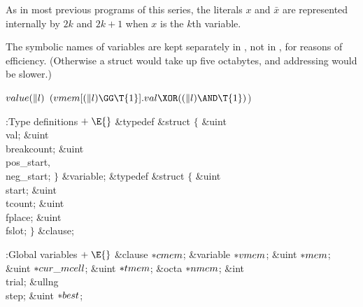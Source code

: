 As in most previous programs of this series, the literals $x$ and $\bar x$
are represented internally by $2k$ and $2k+1$ when $x$ is the $k$th variable.

The symbolic names of variables are kept separately in , not in %
,
for reasons of efficiency. (Otherwise a  struct would
take up five octabytes, and addressing would be slower.)

\Y\B\4\D$\\{value}(\|l)$ \5
$(\\{vmem}[(\|l)\GG\T{1}].\\{val}\XOR((\|l)\AND\T{1}){}$)\par
\Y\B\4:Type definitions\X${}\mathrel+\E{}$\6
\&{typedef} \&{struct} ${}\{{}$\1\6
\&{uint} \\{val};\6
\&{uint} \\{breakcount};\6
\&{uint} \\{pos\_start}${},{}$ \\{neg\_start};\2\6
${}\}{}$ \&{variable};\6
\&{typedef} \&{struct} ${}\{{}$\1\6
\&{uint} \\{start};\6
\&{uint} \\{tcount};\6
\&{uint} \\{fplace};\6
\&{uint} \\{fslot};\2\6
${}\}{}$ \&{clause};\par
\fi

\B{}:Global variables\X${}\mathrel+\E{}$\6
\&{clause} ${}{*}\\{cmem}{}$;\6
\&{variable} ${}{*}\\{vmem}{}$;\6
\&{uint} ${}{*}\\{mem}{}$;\6
\&{uint} ${}{*}\\{cur\_mcell}{}$;\6
\&{uint} ${}{*}\\{tmem}{}$;\6
\&{octa} ${}{*}\\{nmem}{}$;\6
\&{int} \\{trial};\6
\&{ullng} \\{step};\6
\&{uint} ${}{*}\\{best}{}$;\par
\fi

